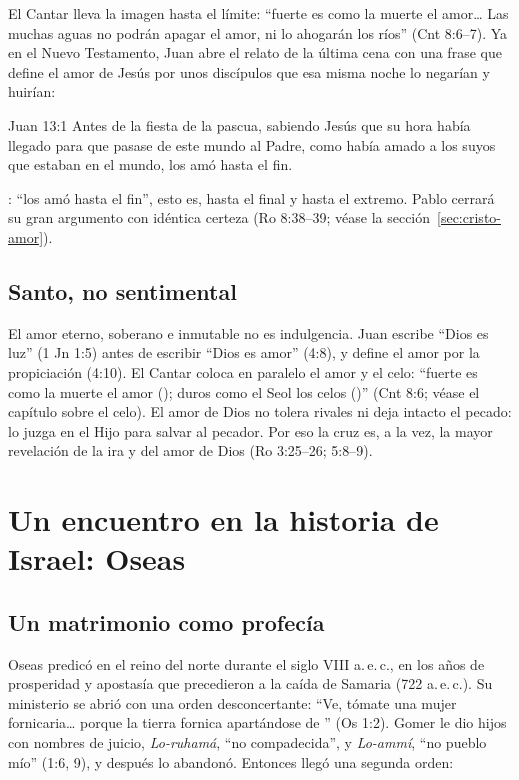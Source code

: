 El Cantar lleva la imagen hasta el límite: ``fuerte es como la muerte el amor\ldots{} Las muchas aguas no podrán apagar el amor, ni lo ahogarán los ríos'' (Cnt 8:6--7). Ya en el Nuevo Testamento, Juan abre el relato de la última cena con una frase que define el amor de Jesús por unos discípulos que esa misma noche lo negarían y huirían:

\begin{verso}{Juan 13:1}
Antes de la fiesta de la pascua, sabiendo Jesús que su hora había llegado para que pasase de este mundo al Padre, como había amado a los suyos que estaban en el mundo, los amó hasta el fin.
\end{verso}

: ``los amó hasta el fin'', esto es, hasta el final y hasta el extremo. Pablo cerrará su gran argumento con idéntica certeza (Ro 8:38--39; véase la sección~\ref{sec:cristo-amor}).


\subsection{Santo, no sentimental}
El amor eterno, soberano e inmutable no es indulgencia. Juan escribe ``Dios es luz'' (1 Jn 1:5) antes de escribir ``Dios es amor'' (4:8), y define el amor por la propiciación (4:10). El Cantar coloca en paralelo el amor y el celo: ``fuerte es como la muerte el amor (); duros como el Seol los celos ()'' (Cnt 8:6; véase el capítulo sobre el celo). El amor de Dios no tolera rivales ni deja intacto el pecado: lo juzga en el Hijo para salvar al pecador. Por eso la cruz es, a la vez, la mayor revelación de la ira y del amor de Dios (Ro 3:25--26; 5:8--9).

\section{Un encuentro en la historia de Israel: Oseas}

\subsection{Un matrimonio como profecía}
Oseas predicó en el reino del norte durante el siglo VIII a.\,e.\,c., en los años de prosperidad y apostasía que precedieron a la caída de Samaria (722 a.\,e.\,c.). Su ministerio se abrió con una orden desconcertante: ``Ve, tómate una mujer fornicaria\ldots{} porque la tierra fornica apartándose de \SENOR'' (Os 1:2). Gomer le dio hijos con nombres de juicio, \emph{Lo-ruhamá}, ``no compadecida'', y \emph{Lo-ammí}, ``no pueblo mío'' (1:6, 9), y después lo abandonó. Entonces llegó una segunda orden:

